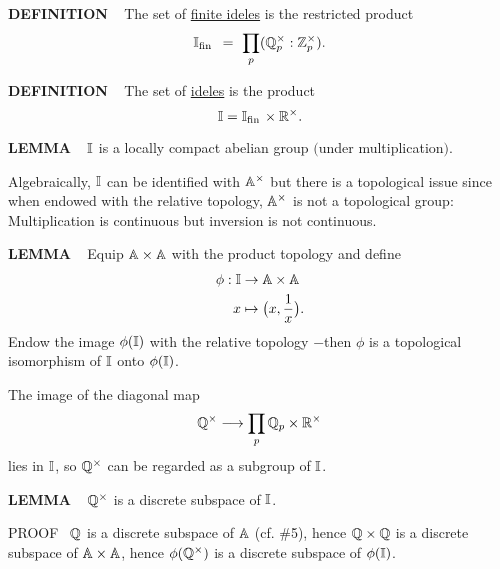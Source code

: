 \vspace{0.1cm}


\begin{x}{\small\bf DEFINITION} \ %
The set of 
\underline{finite ideles}
is the restricted product
\[
\mathbb{I}_{\text{fin}\hspace{0.05cm}}\ = \ \prod\limits_p (\mathbb{Q}_p^\times:\mathbb{Z}_p^\times).
\]
\end{x}

\vspace{0.1cm}

\begin{x}{\small\bf DEFINITION} \ %
The set of 
\underline{ideles}
is the product
\[
\mathbb{I} = \mathbb{I}_{\text{fin}\hspace{0.05cm}} \times \mathbb{R}^\times.
\]
\end{x}

\vspace{0.1cm}


\begin{x}{\small\bf LEMMA} \ %
$\mathbb{I}$ is a locally compact abelian group $($under multiplication$)$.
\end{x}

\vspace{0.1cm}


Algebraically, $\mathbb{I}$  can be identified with $\mathbb{A}^\times$ but there is a topological issue since when endowed with the relative topology, $\mathbb{A}^\times$ is not a topological group: Multiplication is continuous but inversion is not continuous.

\begin{x}{\small\bf LEMMA} \ %
Equip $\mathbb{A} \times \mathbb{A}$ with the product topology and define
\begin{align*}
\phi : \mathbb{I} 	&\rightarrow \mathbb{A} \times \mathbb{A}\\	
x 		&\mapsto \bigl(x, \frac{1}{x}\bigr).
\end{align*}
Endow the image $\phi(\mathbb{I})$ with the relative topology $-$then $\phi$ is a topological isomorphism of $\mathbb{I}$ onto $\phi(\mathbb{I})$.
\end{x}

\vspace{0.1cm}


The image of the diagonal map
\[
\mathbb{Q}^\times \longrightarrow \prod\limits_p \mathbb{Q}_p \times \mathbb{R}^\times
\]
lies in $\mathbb{I}$, so $\mathbb{Q}^\times$ can be regarded as a subgroup of $\mathbb{I}$.

\vspace{0.2cm}

\begin{x}{\small\bf LEMMA} \ %
$\mathbb{Q}^\times$ is a discrete subspace of $\mathbb{I}$.

\vspace{0.1cm}

PROOF \  
$\mathbb{Q}$ is a discrete subspace of $\mathbb{A}$ (cf. \#5), hence  $\mathbb{Q} \times \mathbb{Q}$ is a discrete subspace of $\mathbb{A} \times \mathbb{A}$, 
hence $\phi(\mathbb{Q}^\times)$ is a discrete subspace of $\phi(\mathbb{I})$.
\end{x}

